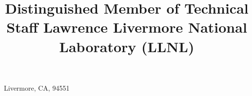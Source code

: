 \title{\normalsize
	Distinguished Member of Technical Staff\newline
	Lawrence Livermore National Laboratory (LLNL)
}                       %
\address{P.O. Box 808, L-557}{Livermore, CA, 94551}    %





\newcommand{\see}[1]{\hfill{\itshape\color{see}\footnotesize{}see #1}}

\newcommand{\br}{\ifinner, \else\\\fi}

\newcommand{\github}[1]{\href{https://github.com/LLNL/#1}{#1}}

\makeatletter
\def\@bibitem#1{%
	\def\mykey{#1}%
	\item\if@filesw\immediate\write\@auxout {\string\bibcite{#1}%
	{\the\value{\@listctr}}}\fi\ignorespaces}



